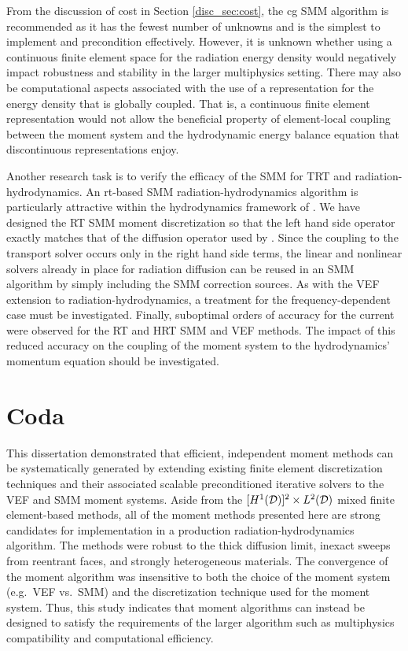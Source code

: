 \documentclass[../doc.tex]{subfiles}
\begin{document}
From the discussion of cost in Section \ref{disc_sec:cost}, the \gls{cg} SMM algorithm is recommended as it has the fewest number of unknowns and is the simplest to implement and precondition effectively. However, it is unknown whether using a continuous finite element space for the radiation energy density would negatively impact robustness and stability in the larger multiphysics setting. There may also be computational aspects associated with the use of a representation for the energy density that is globally coupled. That is, a continuous finite element representation would not allow the beneficial property of element-local coupling between the moment system and the hydrodynamic energy balance equation that discontinuous representations enjoy.  

Another research task is to verify the efficacy of the SMM for TRT and radiation-hydrodynamics. An \gls{rt}-based SMM radiation-hydrodynamics algorithm is particularly attractive within the hydrodynamics framework of \cite{blast}. We have designed the RT SMM moment discretization so that the left hand side operator exactly matches that of the diffusion operator used by \cite{blast}. Since the coupling to the transport solver occurs only in the right hand side terms, the linear and nonlinear solvers already in place for radiation diffusion can be reused in an SMM algorithm by simply including the SMM correction sources. As with the VEF extension to radiation-hydrodynamics, a treatment for the frequency-dependent case must be investigated. 
Finally, suboptimal orders of accuracy for the current were observed for the RT and HRT SMM and VEF methods. The impact of this reduced accuracy on the coupling of the moment system to the hydrodynamics' momentum equation should be investigated. 

\section{Coda}
This dissertation demonstrated that efficient, independent moment methods can be systematically generated by extending existing finite element discretization techniques and their associated scalable preconditioned iterative solvers to the VEF and SMM moment systems. 
Aside from the $[H^1(\mathcal{D})]^2\times L^2(\mathcal{D})$ mixed finite element-based methods, all of the moment methods presented here are strong candidates for implementation in a production radiation-hydrodynamics algorithm. The methods were robust to the thick diffusion limit, inexact sweeps from reentrant faces, and strongly heterogeneous materials. 
The convergence of the moment algorithm was insensitive to both the choice of the moment system (e.g.~VEF vs.~SMM) and the discretization technique used for the moment system. Thus, this study indicates that moment algorithms can instead be designed to satisfy the requirements of the larger algorithm such as multiphysics compatibility and computational efficiency. 
\end{document}
